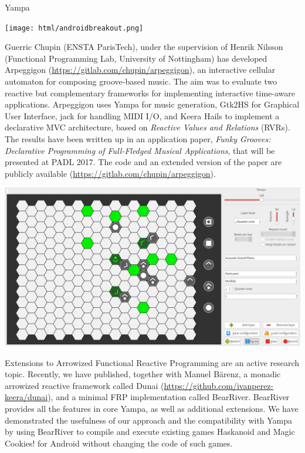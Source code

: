 \begin{hcarentry}[updated]{Yampa}
\begin{center}
\texttt{[image: html/androidbreakout.png]}
\end{center}

Guerric Chupin (ENSTA ParisTech), under the supervision of Henrik Nilsson
(Functional Programming Lab, University of Nottingham) has developed Arpeggigon
(\href{https://gitlab.com/chupin/arpeggigon}{https://gitlab.com/chupin/arpeggigon}),
an interactive cellular automaton for composing groove-based music. The aim was
to evaluate two reactive but complementary frameworks for implementing
interactive time-aware applications. Arpeggigon uses Yampa for music
generation, Gtk2HS for Graphical User Interface, jack for handling MIDI I/O,
and Keera Hails to implement a declarative MVC architecture, based on
\emph{Reactive Values and Relations} (RVRs).  The results have been written up
in an application paper, \emph{Funky Grooves: Declarative Programming of
Full-Fledged Musical Applications}, that will be presented at PADL 2017. The
code and an extended version of the paper are publicly available
(\href{https://gitlab.com/chupin/arpeggigon}{https://gitlab.com/chupin/arpeggigon}).

\begin{center}
\includegraphics[width=\linewidth]{arpeggigon.png}
\end{center}

Extensions to Arrowized Functional Reactive Programming are an active research
topic. Recently, we have published, together with Manuel B\"arenz, a
monadic arrowized reactive framework called Dunai
(\href{https://github.com/ivanperez-keera/dunai}{https://github.com/ivanperez-keera/dunai}),
and a minimal FRP implementation called BearRiver. BearRiver provides all the
features in core Yampa, as well as additional extensions. We have demonstrated
the usefulness of our approach and the compatibility with Yampa by using
BearRiver to compile and execute existing games Haskanoid and Magic Cookies!
for Android without changing the code of such games.


\end{hcarentry}
